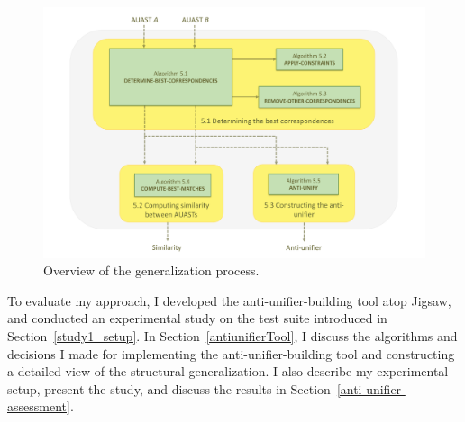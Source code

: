 


\begin{figure}[t]
  \centering\includegraphics [width = \textwidth]{Drawing4/auOverview.pdf}
  \caption{Overview of the generalization process.}
  \label{fig:meth_overview}
\end{figure}


To evaluate my approach, I developed the anti-unifier-building tool atop Jigsaw, and conducted an experimental study on the test suite introduced in Section~\ref{study1_setup}. In Section~\ref{antiunifierTool}, I discuss the algorithms and decisions I made for implementing the anti-unifier-building tool and constructing a detailed view of the structural generalization. I also describe my experimental setup, present the study, and discuss the results in Section~\ref{anti-unifier-assessment}.




